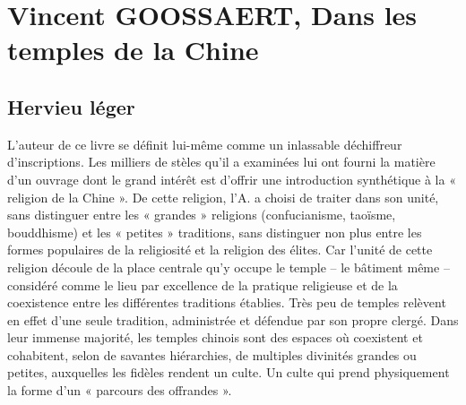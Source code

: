 \chapter{Vincent GOOSSAERT, Dans les temples de la Chine}

\section{Hervieu léger}

L’auteur de ce livre se définit lui-même comme un inlassable déchiffreur d’inscriptions. Les milliers de stèles qu’il a examinées lui ont fourni la matière d’un ouvrage dont le grand intérêt est d’offrir une introduction synthétique à la « religion de la Chine ». De cette religion, l’A. a choisi de traiter dans son unité, sans distinguer entre les « grandes » religions (confucianisme, taoïsme, bouddhisme) et les « petites » traditions, sans distinguer non plus entre les formes populaires de la religiosité et la religion des élites. Car l’unité de cette religion découle de la place centrale qu’y occupe le temple – le bâtiment même – considéré comme le lieu par excellence de la pratique religieuse et de la coexistence entre les différentes traditions établies. Très peu de temples relèvent en effet d’une seule tradition, administrée et défendue par son propre clergé. Dans leur immense majorité, les temples chinois sont des espaces où coexistent et cohabitent, selon de savantes hiérarchies, de multiples divinités grandes ou petites, auxquelles les fidèles rendent un culte. Un culte qui prend physiquement la forme d’un « parcours des offrandes ».

